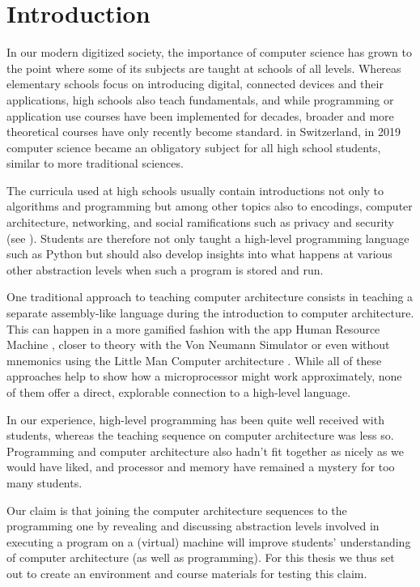 
\chapter{Introduction}

In our modern digitized society, the importance of computer science has grown to the point where some of its subjects are taught at schools of all levels. Whereas elementary schools focus on introducing digital, connected devices and their applications, high schools also teach fundamentals, and while programming or application use courses have been implemented for decades, broader and more theoretical courses have only recently become standard. \eg in Switzerland, in 2019 computer science became an obligatory subject for all high school students, similar to more traditional sciences.

The curricula used at high schools usually contain introductions not only to algorithms and programming but among other topics also to encodings, computer architecture, networking, and social ramifications such as privacy and security (see \eg \cite{Erz16}). Students are therefore not only taught a high-level programming language such as Python but should also develop insights into what happens at various other abstraction levels when such a program is stored and run.

One traditional approach to teaching computer architecture consists in teaching a separate assembly-like language during the introduction to computer architecture. This can happen in a more gamified fashion \eg with the app Human Resource Machine \cite{Tom15}, closer to theory with the Von Neumann Simulator \cite{Gan23} or even without mnemonics using the Little Man Computer architecture \cite{Oin25}. While all of these approaches help to show how a microprocessor might work approximately, none of them offer a direct, explorable connection to a high-level language.

In our experience, high-level programming has been quite well received with students, whereas the teaching sequence on computer architecture was less so. Programming and computer architecture also hadn't fit together as nicely as we would have liked, and processor and memory have remained a mystery for too many students.

Our claim is that joining the computer architecture sequences to the programming one by revealing and discussing abstraction levels involved in executing a program on a (virtual) machine will improve students' understanding of computer architecture (as well as programming). For this thesis we thus set out to create an environment and course materials for testing this claim.

